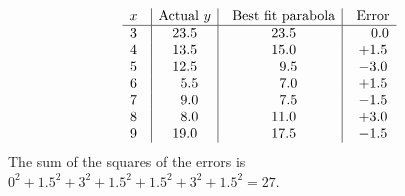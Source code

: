 \documentclass{ximera}
\begin{document}
\begin{solution}
\begin{equation*}
    \begin{array}{c@{~~~}|c|@{~~~}c|@{~~~}c}
      x & \mbox{Actual $y$} & \mbox{Best fit parabola} & \mbox{Error} \\\hline
      3 &  23.5 &  23.5 & ~~~0.0 \\
      4 &  13.5 &  15.0 &   +1.5 \\
      5 &  12.5 & ~~9.5 &   -3.0 \\
      6 & ~~5.5 & ~~7.0 &   +1.5 \\
      7 & ~~9.0 & ~~7.5 &   -1.5 \\
      8 & ~~8.0 &  11.0 &   +3.0 \\
      9 &  19.0 &  17.5 &   -1.5 \\
    \end{array}
  \end{equation*}
  The sum of the squares of the errors is $0^2 + 1.5^2 + 3^2 + 1.5^2 + 1.5^2 + 3^2 + 1.5^2 = 27$.
\end{solution}
\end{document}

